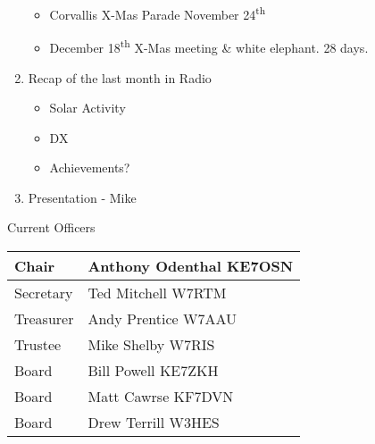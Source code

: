 \documentclass[letter,11pt]{extarticle}
\begin{document}
\begin{enumerate}
\begin{itemize}
				\item Corvallis X-Mas Parade November 24\textsuperscript{th} 
				\item December 18\textsuperscript{th} X-Mas meeting \& white elephant. 28 days.
			\end{itemize}
		\item Recap of the last month in Radio
			\begin{itemize}
				\item Solar Activity
				\item DX
				\item Achievements?
			\end{itemize}
		\item  Presentation - Mike
	\end{enumerate}


	Current Officers \\
	\begin{tabular}{|l|l|} \hline
		Chair & Anthony Odenthal KE7OSN \\ \hline
		Secretary & Ted Mitchell W7RTM \\ \hline
		Treasurer & Andy Prentice W7AAU \\ \hline
		Trustee & Mike Shelby W7RIS   \\ \hline
		Board & Bill Powell KE7ZKH \\ \hline
		Board & Matt Cawrse KF7DVN \\ \hline
		Board & Drew Terrill W3HES\\ \hline
	\end{tabular}
	
	\subsection*{}
	
\end{document}
